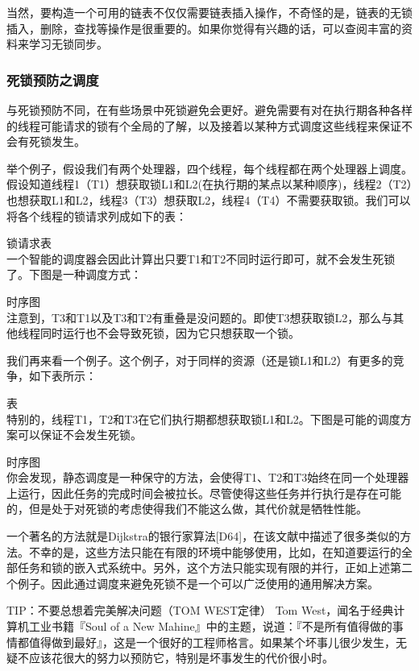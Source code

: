 当然，要构造一个可用的链表不仅仅需要链表插入操作，不奇怪的是，链表的无锁插入，删除，查找等操作是很重要的。如果你觉得有兴趣的话，可以查阅丰富的资料来学习无锁同步。

\subsubsection*{死锁预防之调度}
与死锁预防不同，在有些场景中死锁避免会更好。避免需要有对在执行期各种各样的线程可能请求的锁有个全局的了解，以及接着以某种方式调度这些线程来保证不会有死锁发生。

举个例子，假设我们有两个处理器，四个线程，每个线程都在两个处理器上调度。假设知道线程1（T1）想获取锁L1和L2(在执行期的某点以某种顺序)，线程2（T2）也想获取L1和L2，线程3（T3）想获取L2，线程4（T4）不需要获取锁。我们可以将各个线程的锁请求列成如下的表：

锁请求表\\

一个智能的调度器会因此计算出只要T1和T2不同时运行即可，就不会发生死锁了。下图是一种调度方式：

时序图\\


注意到，T3和T1以及T3和T2有重叠是没问题的。即使T3想获取锁L2，那么与其他线程同时运行也不会导致死锁，因为它只想获取一个锁。

我们再来看一个例子。这个例子，对于同样的资源（还是锁L1和L2）有更多的竞争，如下表所示：

表\\

特别的，线程T1，T2和T3在它们执行期都想获取锁L1和L2。下图是可能的调度方案可以保证不会发生死锁。

时序图\\

你会发现，静态调度是一种保守的方法，会使得T1、T2和T3始终在同一个处理器上运行，因此任务的完成时间会被拉长。尽管使得这些任务并行执行是存在可能的，但是处于对死锁的考虑使得我们不能这么做，其代价就是牺牲性能。

一个著名的方法就是Dijkstra的银行家算法[D64]，在该文献中描述了很多类似的方法。不幸的是，这些方法只能在有限的环境中能够使用，比如，在知道要运行的全部任务和锁的嵌入式系统中。另外，这个方法只能实现有限的并行，正如上述第二个例子。因此通过调度来避免死锁不是一个可以广泛使用的通用解决方案。


TIP：不要总想着完美解决问题（TOM WEST定律）
Tom West，闻名于经典计算机工业书籍『Soul of a New Mahine』中的主题，说道：『不是所有值得做的事情都值得做到最好』，这是一个很好的工程师格言。如果某个坏事儿很少发生，无疑不应该花很大的努力以预防它，特别是坏事发生的代价很小时。

